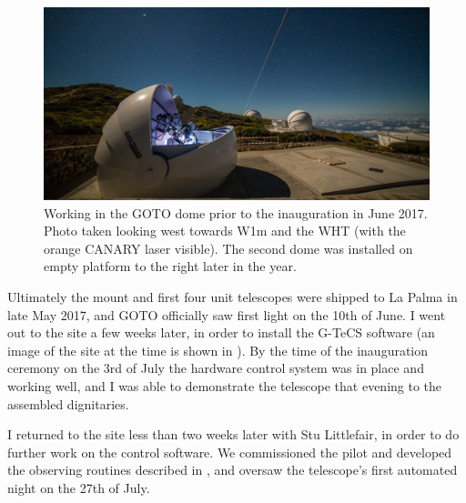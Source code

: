 \begin{colsection}
\begin{colsection}
\begin{figure}[t]
    \begin{center}
        \includegraphics[width=\textwidth]{images/inauguration_photo.jpg}
    \end{center}
    \caption[Working in the GOTO dome prior to the inauguration in June 2017]{
        Working in the GOTO dome prior to the inauguration in June 2017. \\
        Photo taken looking west towards W1m and the WHT (with the orange CANARY laser visible). The second dome was installed on empty platform to the right later in the year.
    }\label{fig:inauguration}
\end{figure}

Ultimately the mount and first four unit telescopes were shipped to La Palma in late May 2017, and GOTO officially saw first light on the 10th of June. I went out to the site a few weeks later, in order to install the G-TeCS software (an image of the site at the time is shown in ). By the time of the inauguration ceremony on the 3rd of July the hardware control system was in place and working well, and I was able to demonstrate the telescope that evening to the assembled dignitaries.

I returned to the site less than two weeks later with Stu Littlefair, in order to do further work on the control software. We commissioned the pilot and developed the observing routines described in , and oversaw the telescope's first automated night on the 27th of July.


\end{colsection}
\end{colsection}
